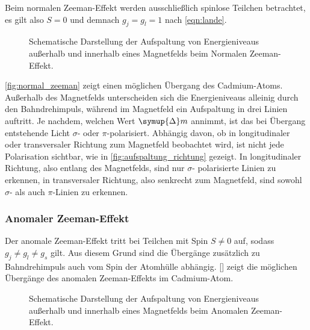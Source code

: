     Beim normalen Zeeman-Effekt werden ausschließlich spinlose Teilchen betrachtet,
    es gilt also $S = 0$ und demnach $g_j = g_l = 1$ nach \autoref{eqn:lande}.
    \begin{figure}[H]
      \centering
        \resizebox{0.5\textwidth}{!}{
            
        }
       \caption{Schematische Darstellung der Aufspaltung von Energieniveaus außerhalb und innerhalb eines Magnetfelds beim Normalen Zeeman-Effekt. \cite{haken_wolf}}
       \label{fig:normal_zeeman}
    \end{figure}
    \autoref{fig:normal_zeeman} zeigt einen möglichen Übergang des Cadmium-Atoms.
    Außerhalb des Magnetfelds unterscheiden sich die Energieniveaus alleinig durch den Bahndrehimpuls,
    während im Magnetfeld ein Aufspaltung in drei Linien auftritt.
    Je nachdem,
    welchen Wert $\symup{\Delta} m$ annimmt,
    ist das bei Übergang entstehende Licht $\sigma$- oder $\pi$-polarisiert.
    Abhängig davon,
    ob in longitudinaler oder transversaler Richtung zum Magnetfeld beobachtet wird,
    ist nicht jede Polarisation sichtbar,
    wie in \autoref{fig:aufspaltung_richtung} gezeigt.
    In longitudinaler Richtung,
    also entlang des Magnetfelds,
    sind nur $\sigma$- polarisierte Linien zu erkennen,
    in transversaler Richtung,
    also senkrecht zum Magnetfeld,
    sind sowohl $\sigma$- als auch $\pi$-Linien zu erkennen.


\subsubsection{Anomaler Zeeman-Effekt}

    Der anomale Zeeman-Effekt tritt bei Teilchen mit Spin $S \neq 0$ auf,
    sodass $g_j \neq g_l \neq g_s$ gilt.
    Aus diesem Grund sind die Übergänge zusätzlich zu Bahndrehimpuls auch vom Spin der Atomhülle abhängig.
    \autoref{} zeigt die möglichen Übergänge des anomalen Zeeman-Effekts im Cadmium-Atom.
    \begin{figure}[H]
      \centering
        \resizebox{0.5\textwidth}{!}{
            
        }
       \caption{Schematische Darstellung der Aufspaltung von Energieniveaus außerhalb und innerhalb eines Magnetfelds beim Anomalen Zeeman-Effekt.}
       \label{fig:anomal_zeeman}
    \end{figure}


